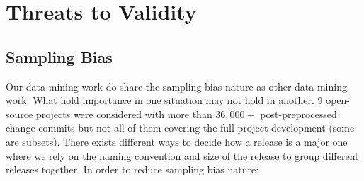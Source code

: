 \documentclass[10pt,conference]{IEEEtran}
\newenvironment{RQ}[1]%
{\noindent\begin{minipage}[c]{\linewidth}%
\begin{bclogo}[couleur=gray!25,%
                arrondi=0.1,%
                logo=\bctrombone,%
                ombre=true]{~#1}}%
{\end{bclogo}\end{minipage}\vspace{2mm}}
\begin{document}









\section{Threats to Validity }

\subsection{Sampling Bias}

Our data mining work do share the sampling bias nature as other data mining work. What hold importance in one situation may not hold in another. 9 open-source projects were considered with more than $36,000+$ post-preprocessed change commits but not all of them covering the full project development (some are subsets). There exists different ways to decide how a release is a major one where we rely on the naming convention and size of the release to group different releases together. In order to reduce sampling bias nature:
\end{document}
